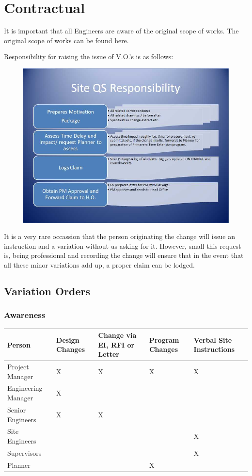 \chapter{Contractual}

It is important that all Engineers are aware of the original scope of works. The original scope of works can be found here.

Responsibility for raising the issue of V.O.'s is as follows:

\begin{figure}
\includegraphics[width=1.3\textwidth]{./graphics/Site-QS-responsibilities}
\end{figure}


It is a very rare occassion that the person originating the change will
issue an instruction and a variation without us asking for it. However,
small this request is, being professional and recording the change will
ensure that in the event that all these minor variations add up, a proper claim
can be lodged.

\section*{Variation Orders}

\subsection*{Awareness}

\begin{tabular}{|l|l|p{2.0cm}|p{2.0cm}|p{2.0cm}|}
\hline
Person &Design Changes&Change via EI, RFI or Letter&Program Changes&Verbal Site Instructions\\\hline
Project Manager    &X&X&X&X\\\hline
Engineering Manager&X& & & \\\hline
Senior Engineers   &X&X& & \\\hline  
Site Engineers     & & & &X\\\hline
Supervisors        & & & &X\\\hline
Planner            & & &X& \\\hline
\end{tabular}  

